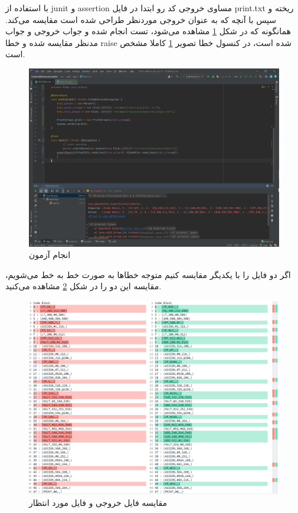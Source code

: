 با استفاده از junit و assertion مساوی خروجی کد رو ابتدا در فایل print.txt ریخته و سپس با آنچه که به عنوان خروجی موردنظر طراحی شده است مقایسه می‌کند. همانگونه که در شکل \ref{fig:6} مشاهده می‌شود، تست انجام شده و جواب خروجی و جواب مدنظر مقایسه شده و خطا raise شده است، در کنسول خطا تصویر \ref{fig:6} کاملا مشخص است.
\begin{figure}[ht]
\centering
\includegraphics[scale=0.35]{test.PNG}
\caption{انجام آزمون}
\label{fig:6}
\end{figure}


اگر دو فایل را با یکدیگر مقایسه کنیم متوجه خطاها به صورت خط به خط می‌شویم، مقایسه این دو را در شکل \ref{fig:7} مشاهده می‌کنید.

\begin{figure}[ht]
\centering
\includegraphics[scale=0.5]{diff.PNG}
\caption{مقایسه فایل خروجی و فایل مورد انتظار}
\label{fig:7}
\end{figure}

